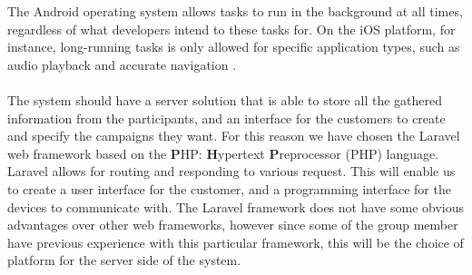 The Android operating system allows tasks to run in the background at all times, regardless of what developers intend to these tasks for. On the iOS platform, for instance, long-running tasks is only allowed for specific application types, such as audio playback and accurate navigation \parencite{apple_long_running_task}.
\\\\
The system should have a server solution that is able to store all the gathered information from the participants, and an interface for the customers to create and specify the campaigns they want. For this reason we have chosen the Laravel web framework based on the \textbf{P}HP: \textbf{H}ypertext \textbf{P}reprocessor (PHP) language. Laravel allows for routing and responding to various request. This will enable us to create a user interface for the customer, and a programming interface for the devices to communicate with. The Laravel framework does not have some obvious advantages over other web frameworks, however since some of the group member have previous experience with this particular framework, this will be the choice of platform for the server side of the system.


